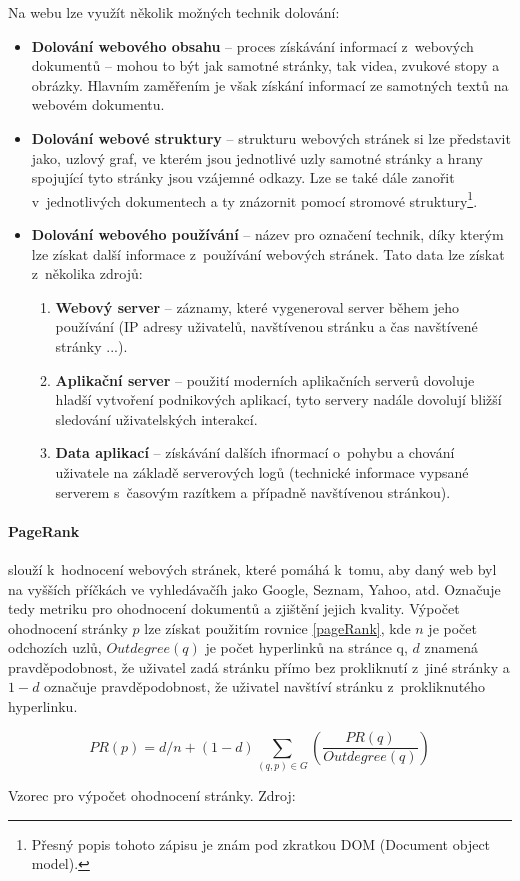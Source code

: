 \par Na webu lze využít několik možných technik dolování:
\begin{itemize}
\item \textbf{Dolování webového obsahu} -- proces získávání informací z~webových dokumentů -- mohou to být jak samotné stránky, tak videa, zvukové stopy a obrázky. Hlavním zaměřením je však získání informací ze samotných textů na webovém dokumentu.
\item \textbf{Dolování webové struktury} -- strukturu webových stránek si lze představit jako, uzlový graf, ve kterém jsou jednotlivé uzly samotné stránky a hrany spojující tyto stránky jsou vzájemné odkazy. Lze se také dále zanořit v~jednotlivých dokumentech a ty znázornit pomocí stromové struktury\footnote{Přesný popis tohoto zápisu je znám pod zkratkou DOM (Document object model).}.
\item \textbf{Dolování webového používání} -- název pro označení technik, díky kterým lze získat další informace z~používání webových stránek. Tato data lze získat z~několika zdrojů:
\begin{enumerate}
  \item \textbf{Webový server} -- záznamy, které vygeneroval server během jeho používání (IP adresy uživatelů, navštívenou stránku a čas navštívené stránky ...).
  \item \textbf{Aplikační server} -- použití moderních aplikačních serverů dovoluje hladší vytvoření podnikových aplikací, tyto servery nadále dovolují bližší sledování uživatelských interakcí.
  \item \textbf{Data aplikací} --  získávání dalších ifnormací o~pohybu a chování uživatele na základě serverových logů (technické informace vypsané serverem s~časovým razítkem a případně navštívenou stránkou). \cite{minigbook}
\end{enumerate}
\end{itemize}

\paragraph{PageRank} slouží k~hodnocení webových stránek, které pomáhá k~tomu, aby daný web byl na vyšších příčkách ve vyhledávačíh jako Google, Seznam, Yahoo, atd. Označuje tedy metriku pro ohodnocení dokumentů a zjištění jejich kvality. Výpočet ohodnocení stránky \(p\) lze získat použitím rovnice \ref{pageRank}, kde \(n\) je počet odchozích uzlů, \(Outdegree(q)\) je počet hyperlinků na stránce q, \(d\) znamená pravděpodobnost, že uživatel zadá stránku přímo bez prokliknutí z~jiné stránky a \(1 - d\) označuje pravděpodobnost, že uživatel navštíví stránku z~prokliknutého hyperlinku. \cite{minigbook}
\begin{equationcap}[!htp]
\centering
\begin{equation} \label{pageRank}
PR(p) = d/n + (1-d) \sum_{(q,p) \in G}(\frac{PR(q)}{Outdegree(q)})
\end{equation}
\caption[Vzorec pro výpočet ohodnocení stránky]{Vzorec pro výpočet ohodnocení stránky. Zdroj: \cite{data-mining-principles}}
\end{equationcap}


